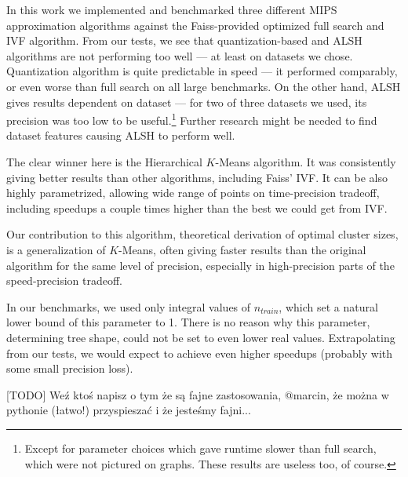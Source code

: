 In this work we implemented and benchmarked three different MIPS 
approximation algorithms
against the Faiss-provided optimized full search and IVF algorithm.
From our tests, we see that quantization-based and ALSH algorithms
are not performing too well --- at least on datasets we chose.
Quantization algorithm is quite predictable in speed --- it performed
comparably, or even worse than full search on all large benchmarks.
On the other hand, ALSH gives results dependent on dataset --- for
two of three datasets we used, its precision was too low to be useful.\footnote{
Except for parameter choices which gave runtime slower than full search,
which were not pictured on graphs. These results are useless too, of course.}
Further research might be needed to find dataset features causing
ALSH to perform well.

The clear winner here is the Hierarchical $K$-Means algorithm. It was consistently
giving better results than other algorithms, including Faiss' IVF. It can be also
highly parametrized, allowing wide range of points on time-precision tradeoff,
including speedups a couple times higher than the best we could get from IVF.

Our contribution to this algorithm, theoretical derivation of optimal cluster sizes,
is a generalization of $K$-Means, often giving faster results than the original algorithm
for the same level of precision, especially in high-precision parts of the
speed-precision tradeoff.

In our benchmarks, we used only integral values of $n_{train}$, which set
a natural lower bound of this parameter to 1. There is no reason why this
parameter, determining tree shape, could not be set to even lower real values.
Extrapolating from our tests, we would expect to achieve even higher speedups
(probably with some small precision loss).

[TODO] Weź ktoś napisz o tym że są fajne zastosowania, @marcin, że można w
pythonie (łatwo!) przyspieszać i że jesteśmy fajni... 

